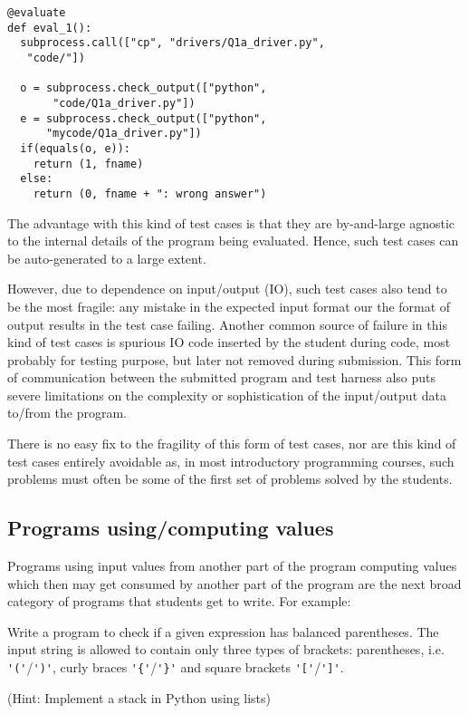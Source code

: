 \documentclass[12pt]{article}
\begin{document}
\begin{lstlisting}[style=pc]
@evaluate
def eval_1():
  subprocess.call(["cp", "drivers/Q1a_driver.py",
   "code/"])

  o = subprocess.check_output(["python",
       "code/Q1a_driver.py"])
  e = subprocess.check_output(["python",
      "mycode/Q1a_driver.py"])
  if(equals(o, e)):
    return (1, fname)
  else:
    return (0, fname + ": wrong answer")
\end{lstlisting}

The advantage with this kind of test cases is that they are by-and-large agnostic to the internal details of the program being evaluated. Hence, such test cases can be auto-generated to a large extent.

However, due to dependence on input/output (IO), such test cases also tend to be the most fragile: any mistake in the expected input format our the format of output results in the test case failing. Another common source of failure in this kind of test cases is spurious IO code inserted by the student during code, most probably for testing purpose, but later not removed during submission. This form of communication between the submitted program and test harness also puts severe limitations on the complexity or sophistication of the input/output data to/from the program.

There is no easy fix to the fragility of this form of test cases, nor are this kind of test cases entirely avoidable as, in most introductory programming courses, such problems must often be some of the first set of problems solved by the students.

\subsection{Programs using/computing values}
Programs using input values from another part of the program computing values which then may get consumed by another part of the program are the next broad category of programs that students get to write. For example:

\begin{mdframed}[frametitle=Example]
Write a program to check if a given expression has balanced parentheses. The input string is allowed to contain only three types of brackets: parentheses, i.e. \lstinline[style=pc]@'('@/\lstinline[style=pc]@')'@, curly braces \lstinline[style=pc]@'{'@/\lstinline[style=pc]@'}'@ and square brackets \lstinline[style=pc]@'['@/\lstinline[style=pc]@']'@.

(Hint: Implement a stack in Python using lists)

\end{mdframed}
\end{document}
